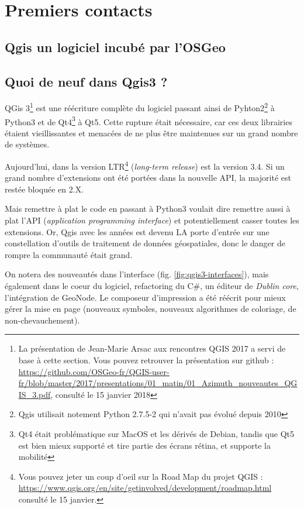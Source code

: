 \documentclass[a4paper, 11pt]{article}
\begin{document}
\section{Premiers contacts}
  \subsection{Qgis un logiciel incubé par l'OSGeo}

  \subsection{Quoi de neuf dans Qgis3 ?}
  QGis 3\footnote{La présentation de Jean-Marie Arsac aux rencontres QGIS 2017 a servi de base à cette section. Vous pouvez retrouver la présentation sur github : \url{https://github.com/OSGeo-fr/QGIS-user-fr/blob/master/2017/presentations/01_matin/01_Azimuth_nouveautes_QGIS_3.pdf}, consulté le 15 janvier 2018} est une réécriture complète du logiciel passant ainsi de Pyhton2\footnote{Qgis utilisait notement Python 2.7.5-2 qui n'avait pas évolué depuis 2010} à Python3 et de Qt4\footnote{Qt4 était problématique sur MacOS et les dérivés de Debian, tandis que Qt5 est bien mieux supporté et tire partie des écrans rétina, et supporte la mobilité} à Qt5. Cette rupture était nécessaire, car ces deux librairies étaient vieillissantes et menacées de ne plus être maintenues sur un grand nombre de systèmes.

  Aujourd’hui, dans la version LTR\footnote{Vous pouvez jeter un coup d'oeil sur la Road Map du projet QGIS : \url{https://www.qgis.org/en/site/getinvolved/development/roadmap.html} consulté le 15 janvier.} (\textit{long-term release}) est la version 3.4. Si un grand nombre d'extensions ont été portées dans la nouvelle API, la majorité est restée bloquée en 2.X.

  Mais remettre à plat le code en passant à Python3 voulait dire remettre aussi à plat l'API (\textit{application programming interface}) et potentiellement casser toutes les extensions. Or, Qgis avec les années est devenu LA porte d'entrée sur une constellation d'outils de traitement de données géospatiales, donc le danger de rompre la communauté était grand.

  On notera des nouveautés dans l'interface (fig. \ref{fig:qgis3-interfaces}), mais également dans le coeur du logiciel, refactoring du C\#, un éditeur de \textit{Dublin core}, l'intégration de GeoNode. Le composeur d'impression a été réécrit pour mieux gérer la mise en page (nouveaux symboles, nouveaux algorithmes de coloriage, de non-chevauchement).
\end{document}
